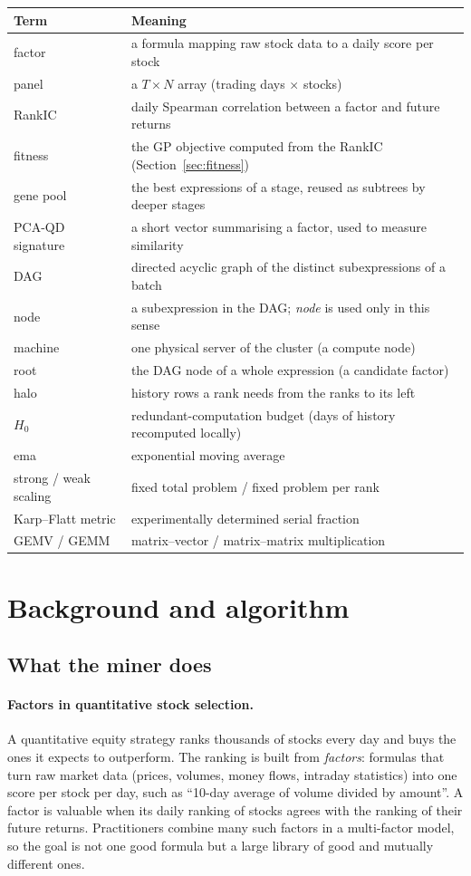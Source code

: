 \documentclass[11pt,a4paper]{article}
\begin{document}
\begin{tabular}{@{}ll@{}}
\toprule
Term & Meaning \\
\midrule
factor & a formula mapping raw stock data to a daily score per stock \\
panel & a $T\times N$ array (trading days $\times$ stocks) \\
RankIC & daily Spearman correlation between a factor and future returns \\
fitness & the GP objective computed from the RankIC (Section~\ref{sec:fitness}) \\
gene pool & the best expressions of a stage, reused as subtrees by deeper stages \\
PCA-QD signature & a short vector summarising a factor, used to measure similarity \\
DAG & directed acyclic graph of the distinct subexpressions of a batch \\
node & a subexpression in the DAG; \emph{node} is used only in this sense \\
machine & one physical server of the cluster (a compute node) \\
root & the DAG node of a whole expression (a candidate factor) \\
halo & history rows a rank needs from the ranks to its left \\
$H_0$ & redundant-computation budget (days of history recomputed locally) \\
ema & exponential moving average \\
strong / weak scaling & fixed total problem / fixed problem per rank \\
Karp--Flatt metric & experimentally determined serial fraction \\
GEMV / GEMM & matrix--vector / matrix--matrix multiplication \\
\bottomrule
\end{tabular}

\section{Background and algorithm}

\subsection{What the miner does}
\paragraph{Factors in quantitative stock selection.} A quantitative equity strategy ranks thousands of stocks every day and buys the ones it expects to outperform. The ranking is built from \emph{factors}: formulas that turn raw market data (prices, volumes, money flows, intraday statistics) into one score per stock per day, such as ``10-day average of volume divided by amount''. A factor is valuable when its daily ranking of stocks agrees with the ranking of their future returns. Practitioners combine many such factors in a multi-factor model, so the goal is not one good formula but a large library of good and mutually different ones.
\end{document}
